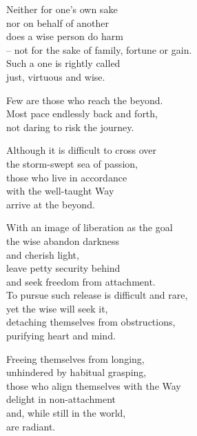Neither for one's own sake\\
nor on behalf of another\\
does a wise person do harm\\
– not for the sake of family, fortune or gain.\\
Such a one is rightly called\\
just, virtuous and wise.


Few are those who reach the beyond.\\
Most pace endlessly back and forth,\\
not daring to risk the journey.


Although it is difficult to cross over\\
the storm-swept sea of passion,\\
those who live in accordance\\
with the well-taught Way\\
arrive at the beyond.


With an image of liberation as the goal\\
the wise abandon darkness\\
and cherish light,\\
leave petty security behind\\
and seek freedom from attachment.\\
To pursue such release is difficult and rare,\\
yet the wise will seek it,\\
detaching themselves from obstructions,\\
purifying heart and mind.


Freeing themselves from longing,\\
unhindered by habitual grasping,\\
those who align themselves with the Way\\
delight in non-attachment\\
and, while still in the world,\\
are radiant.

